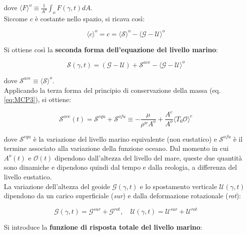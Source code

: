 \documentclass[a4paper,12pt]{book}
\begin{document}
\noindent
dove $\langle F\rangle^o \equiv \frac{1}{A^o} \int_o F(\gamma, t) dA$.\\

\noindent Siccome $c$ è costante nello spazio, si ricava così:

\begin{equation}
    \langle c \rangle^o = c = \langle \mathcal{S} \rangle^o - \langle \mathcal{G} - \mathcal{U} \rangle^o
\end{equation}

\noindent Si ottiene così la \textbf{seconda forma dell'equazione del livello marino}:

\begin{equation}
    \mathcal{S}(\gamma, t) = (\mathcal{G} - \mathcal{U}) + \mathcal{S}^{ave} - \langle\mathcal{G} - \mathcal{U}\rangle^o
\end{equation}

\noindent
dove $\mathcal{S}^{ave} \equiv \langle \mathcal{S} \rangle^o$.\\

\noindent
Applicando la terza forma del principio di conservazione della massa (eq. \ref{eq:MCP3}), si ottiene:

\begin{equation}
    \mathcal{S}^{ave} (t) = \mathcal{S}^{equ} + \mathcal{S}^{ofu} \equiv - \frac{\mu}{\rho^w A^o} + \frac{A^e}{A^o} \langle T_0 \mathcal{O}\rangle^e
\end{equation}

\noindent
dove $\mathcal{S}^{equ}$ è la variazione del livello marino equivalente (non eustatico) e $\mathcal{S}^{ofu}$ è il termine associato alla variazione della funzione oceano.
Dal momento in cui $A^o(t)$ e $\mathcal{O}(t)$ dipendono dall'altezza del livello del mare,
queste due quantità sono dinamiche e dipendono quindi dal tempo e dalla reologia, a differenza del livello eustatico.\\

\noindent
La variazione dell'altezza del geoide $\mathcal{G}(\gamma, t)$ e lo spostamento verticale $\mathcal{U}(\gamma, t)$ dipendono da un carico superficiale (\textit{sur}) e dalla deformazione rotazionale (\textit{rot}):

\begin{equation}
    \mathcal{G}(\gamma, t) = \mathcal{G}^{sur} + \mathcal{G}^{rot} , \quad \mathcal{U}(\gamma, t) = \mathcal{U}^{sur} + \mathcal{U}^{rot}
\end{equation}

\noindent Si introduce la \textbf{funzione di risposta totale del livello marino}:
\end{document}
